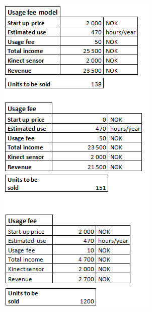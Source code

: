 \begin{figure}
\begin{center}
\includegraphics[scale=0.8]{usageall}
\label{fig:UsageAll}
\end{center}
\end{figure}